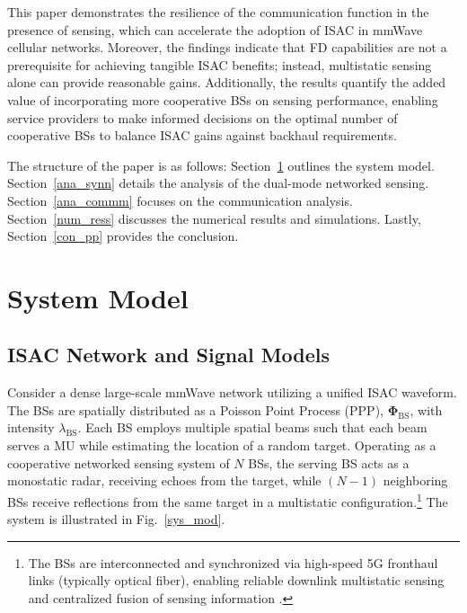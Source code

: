 \documentclass[journal]{IEEEtran}
\begin{document}
This paper demonstrates the resilience of the communication function in the presence of sensing, which can accelerate the adoption of ISAC in mmWave cellular networks. Moreover, the findings indicate that FD capabilities are not a prerequisite for achieving tangible ISAC benefits; instead, multistatic sensing alone can provide reasonable gains. Additionally, the results quantify the added value of incorporating more cooperative BSs on sensing performance, enabling service providers to make informed decisions on the optimal number of cooperative BSs to balance ISAC gains against backhaul requirements.






 The structure of the paper is as follows: Section~\ref{sys_modd} outlines the system model. Section~\ref{ana_synn} details the analysis of the dual-mode networked sensing. Section~\ref{ana_commm} focuses on the communication analysis. Section~\ref{num_ress} discusses the numerical results and simulations. Lastly, Section~\ref{con_pp} provides the conclusion.






\section{System Model}\label{sys_modd}

\subsection{ISAC Network and Signal Models}


Consider a dense large-scale mmWave network utilizing a unified ISAC waveform. The BSs are spatially distributed as a Poisson Point Process (PPP), $\boldsymbol{\Phi}_{\mathrm{BS}}$, with intensity $\lambda_{\mathrm{BS}}$. Each BS employs multiple spatial beams such that each beam serves a MU while estimating the location of a random target. Operating as a cooperative networked sensing system of $N$ BSs, the serving BS acts as a monostatic radar, receiving echoes from the target, while  $(N-1)$ neighboring BSs receive reflections from the same target in a multistatic configuration.\footnote{The BSs are interconnected and synchronized via high-speed 5G fronthaul links (typically optical fiber), enabling reliable downlink multistatic sensing and centralized fusion of sensing information \cite{liu2022integrated,zhang2021enabling,cui2024integrated}.} The system is illustrated in Fig.~\ref{sys_mod}.
  
\end{document}
